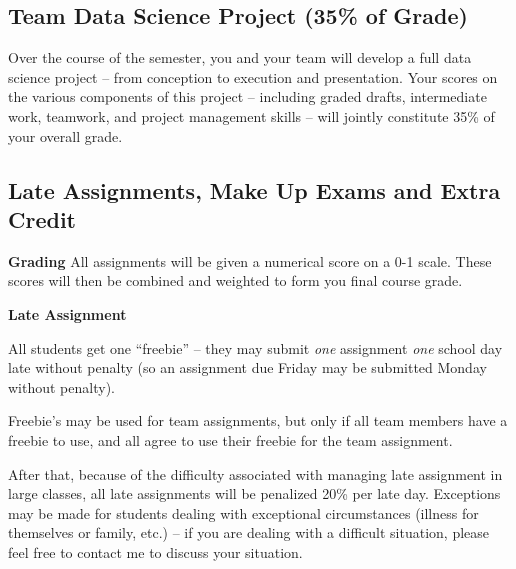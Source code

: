 \documentclass[12pt]{article}
\begin{document}
\subsection{Team Data Science Project (35\% of Grade)}

Over the course of the semester, you and your team will develop a full data science project -- from conception to execution and presentation. Your scores on the various components of this project -- including graded drafts, intermediate work, teamwork, and project management skills -- will jointly constitute 35\% of your overall grade.

\subsection{Late Assignments, Make Up Exams and Extra Credit}


\textbf{Grading}
All assignments will be given a numerical score on a 0-1 scale.  These scores will then be combined and weighted to form you final course grade.

\textbf{Late Assignment}

All students get one ``freebie'' -- they may submit \emph{one} assignment \emph{one} school day late without penalty (so an assignment due Friday may be submitted Monday without penalty).

Freebie's may be used for team assignments, but only if all team members have a freebie to use, and all agree to use their freebie for the team assignment.

After that, because of the difficulty associated with managing late assignment in large classes, all late assignments will be penalized 20\% per late day. Exceptions may be made for students dealing with exceptional circumstances (illness for themselves or family, etc.) -- if you are dealing with a difficult situation, please feel free to contact me to discuss your situation.
\end{document}
